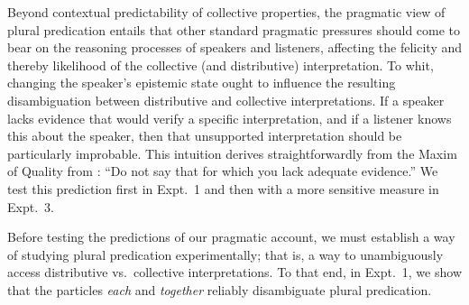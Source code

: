 \documentclass[preprint,12pt,authoryear,titlepage]{elsarticle}
\newcommand{\gcs}[1]{\textcolor{blue}{[gcs: #1]}}
\begin{document}
Beyond contextual predictability of collective properties, the pragmatic view of plural predication entails that other standard pragmatic pressures should come to bear on the reasoning processes of speakers and listeners, affecting the felicity and thereby likelihood of the collective (and distributive) interpretation.
To whit, changing the speaker's epistemic state ought to influence the resulting disambiguation between distributive and collective interpretations. 
If a speaker lacks evidence that would verify a specific interpretation, and if a listener knows this about the speaker, then that unsupported interpretation should be particularly improbable. This intuition derives straightforwardly from the Maxim of Quality from \cite{grice1975}: ``Do not say that for which you lack adequate evidence.'' 
We test this prediction first in Expt.~1 and then with a more sensitive measure in Expt.~3.


Before testing the predictions of our pragmatic account, we must establish a way of studying plural predication experimentally; that is, a way to unambiguously access distributive vs.~collective interpretations. To that end, in Expt.~1, we show that the particles \emph{each} and \emph{together} reliably disambiguate plural predication. 










\end{document}
